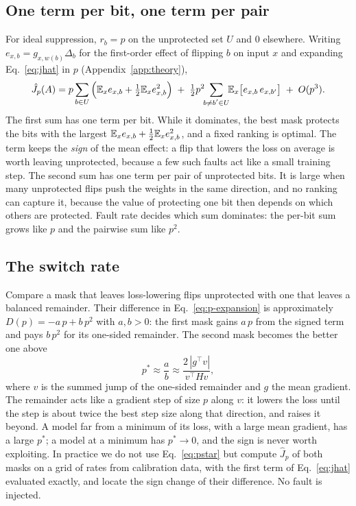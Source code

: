 \subsection{One term per bit, one term per pair}
For ideal suppression, $r_b=p$ on the unprotected set $U$ and $0$ elsewhere. Writing $e_{x,b}=g_{x,w(b)}\Delta_b$ for the first-order effect of flipping $b$ on input $x$ and expanding Eq.~\eqref{eq:jhat} in $p$ (Appendix~\ref{app:theory}),
\begin{equation}\label{eq:p-expansion}
\hat J_p(A)=p\sum_{b\in U}\Big(\mathbb{E}_x e_{x,b}+\tfrac12\mathbb{E}_x e_{x,b}^2\Big)\;+\;\tfrac12p^2\!\!\sum_{\substack{b\ne b'\in U}}\!\!\mathbb{E}_x\big[e_{x,b}\,e_{x,b'}\big]\;+\;O(p^3).
\end{equation}
The first sum has one term per bit. While it dominates, the best mask protects the bits with the largest $\mathbb{E}_x e_{x,b}+\tfrac12\mathbb{E}_x e_{x,b}^2$, and a fixed ranking is optimal. The term keeps the \emph{sign} of the mean effect: a flip that lowers the loss on average is worth leaving unprotected, because a few such faults act like a small training step. The second sum has one term per pair of unprotected bits. It is large when many unprotected flips push the weights in the same direction, and no ranking can capture it, because the value of protecting one bit then depends on which others are protected. Fault rate decides which sum dominates: the per-bit sum grows like $p$ and the pairwise sum like $p^2$.

\subsection{The switch rate}
Compare a mask that leaves loss-lowering flips unprotected with one that leaves a balanced remainder. Their difference in Eq.~\eqref{eq:p-expansion} is approximately $D(p)=-a\,p+b\,p^2$ with $a,b>0$: the first mask gains $a\,p$ from the signed term and pays $b\,p^2$ for its one-sided remainder. The second mask becomes the better one above
\begin{equation}\label{eq:pstar}
p^*\approx\frac{a}{b}\approx\frac{2\,|g^\top v|}{v^\top H v},
\end{equation}
where $v$ is the summed jump of the one-sided remainder and $g$ the mean gradient. The remainder acts like a gradient step of size $p$ along $v$: it lowers the loss until the step is about twice the best step size along that direction, and raises it beyond. A model far from a minimum of its loss, with a large mean gradient, has a large $p^*$; a model at a minimum has $p^*\to0$, and the sign is never worth exploiting. In practice we do not use Eq.~\eqref{eq:pstar} but compute $\hat J_p$ of both masks on a grid of rates from calibration data, with the first term of Eq.~\eqref{eq:jhat} evaluated exactly, and locate the sign change of their difference. No fault is injected.

